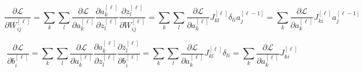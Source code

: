 \documentclass[a4paper, 12pt]{report}
\begin{document}
\begin{equation}
\frac{\partial\mathcal L}{\partial W_{ij}^{[\ell]}}
=\sum_{k}\sum_l\frac{\partial\mathcal L}{\partial a_k^{[\ell]}}\frac{\partial a_k^{[\ell]}}{\partial z_l^{[\ell]}}\frac{\partial z_l^{[\ell]}}{\partial W_{ij}^{[\ell]}}
=\sum_k\sum_l\frac{\partial\mathcal L}{\partial a_k^{[\ell]}} J_{kl}^{[\ell]}\delta_{li}a_j^{[\ell-1]}
= \sum_k\frac{\partial\mathcal L}{\partial a_k^{[\ell]}} J_{ki}^{[\ell]} a_j^{[\ell-1]}
\end{equation}

\begin{equation}
\frac{\partial\mathcal L}{\partial b_i^{[\ell]}}
=\sum_{k}\sum_l\frac{\partial\mathcal L}{\partial a_k^{[\ell]}}\frac{\partial a_k^{[\ell]}}{\partial z_l^{[\ell]}}\frac{\partial z_l^{[\ell]}}{\partial b_i^{[\ell]}}
=\sum_k\sum_l\frac{\partial\mathcal L}{\partial a_k^{[\ell]}} J_{kl}^{[\ell]}\delta_{li}
= \sum_k\frac{\partial\mathcal L}{\partial a_k^{[\ell]}} J_{ki}^{[\ell]}
\end{equation}
\end{document}

